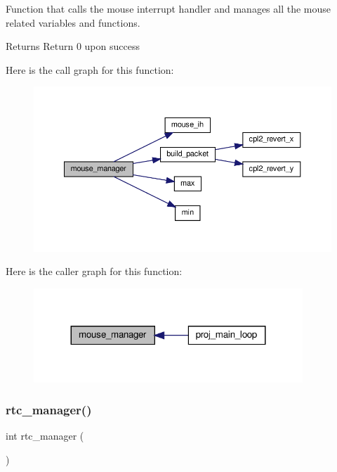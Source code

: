 Function that calls the mouse interrupt handler and manages all the mouse related variables and functions. 

\begin{DoxyReturn}{Returns}
Return 0 upon success 
\end{DoxyReturn}
Here is the call graph for this function\+:
\nopagebreak
\begin{figure}[H]
\begin{center}
\leavevmode
\includegraphics[width=350pt]{group__main__functions_ga8c9f11a032076f800d5d8e3faea17c9a_cgraph}
\end{center}
\end{figure}
Here is the caller graph for this function\+:\nopagebreak
\begin{figure}[H]
\begin{center}
\leavevmode
\includegraphics[width=287pt]{group__main__functions_ga8c9f11a032076f800d5d8e3faea17c9a_icgraph}
\end{center}
\end{figure}
\mbox{\label{group__main__functions_gac1cad6d7c8507831aa74d165972cb1a9}} 
\subsubsection{\texorpdfstring{rtc\+\_\+manager()}{rtc\_manager()}}
{\footnotesize\ttfamily int rtc\+\_\+manager (\begin{DoxyParamCaption}{ }\end{DoxyParamCaption})}



